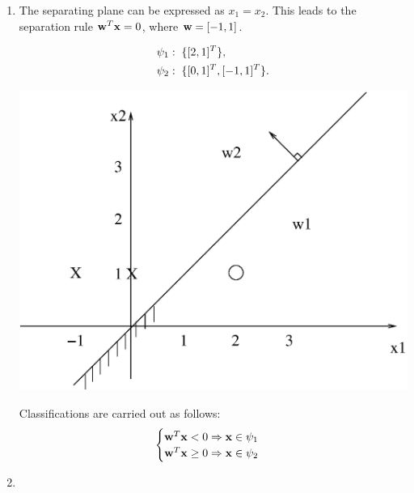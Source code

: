 \begin{enumerate}
\begin{solution}
    \begin{enumerate} 
    \item

      The separating plane can be expressed as $x_1 = x_2$. This leads to
      the separation rule ${\bf{w}}^T {\bf{x}}=0$, where ${\bf{w}}=[-1,1]$.
      
      \begin{align}
        &\psi_1: \text{\;} \{[2,1]^T\}, \notag \\
        &\psi_2: \text{\;} \{[0,1]^T, [-1,1]^T \}. \notag
      \end{align}
      \begin{center}
        \includegraphics[scale=0.35]{e4_5.eps}
      \end{center}

      Classifications are carried out as follows:
      \begin{equation*}
        \begin{cases}
          {\bf{w}}^T{\bf{x}}<0 \Rightarrow {\bf{x}} \in \psi_1\\
          {\bf{w}}^T{\bf{x}}\geq 0 \Rightarrow {\bf{x}} \in \psi_2\\
        \end{cases}
      \end{equation*}

    \item


\end{enumerate}
\end{solution}
\end{enumerate}
